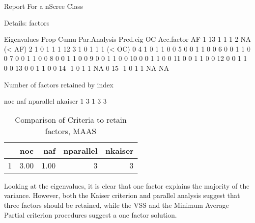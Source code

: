 \documentclass{article}
\begin{document}
Report For a nScree Class 

Details: factors 

   Eigenvalues Prop Cumu Par.Analysis Pred.eig     OC Acc.factor     AF
1           13    1    1            1        2                NA (< AF)
2            1    0    1            1        1                12       
3            1    0    1            1        1 (< OC)          0       
4            1    0    1            1        0                 0       
5            0    0    1            1        0                 0       
6            0    0    1            1        0                 0       
7            0    0    1            1        0                 0       
8            0    0    1            1        0                 0       
9            0    0    1            1        0                 0       
10           0    0    1            1        0                 0       
11           0    0    1            1        0                 0       
12           0    0    1            1        0                 0       
13           0    0    1            1        0                 0       
14          -1    0    1            1       NA                 0       
15          -1    0    1            1       NA                NA       


 Number of factors retained by index 

  noc naf nparallel nkaiser
1   3   1         3       3
\begin{table}[ht]
\centering
\begin{tabular}{rrrrr}
  \hline
 & noc & naf & nparallel & nkaiser \\ 
  \hline
1 & 3.00 & 1.00 &   3 &   3 \\ 
   \hline
\end{tabular}
\caption{Comparison of Criteria to retain factors, MAAS} 
\label{tab:maasretain}
\end{table}
Looking at the eigenvalues, it is clear that one factor explains the majority of the variance. However, both the Kaiser criterion and parallel analysis suggest that three factors should be retained, while the VSS and the Minimum Average Partial criterion procedures suggest a one factor solution.
\end{document}
